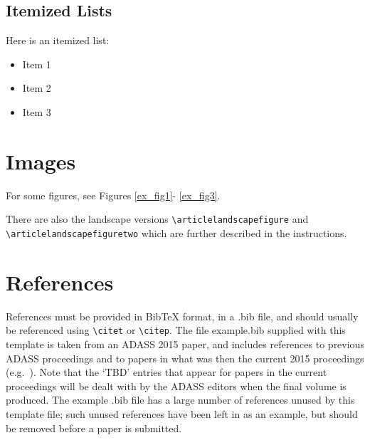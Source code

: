 \documentclass[11pt,twoside]{article}
\begin{document}
\subsection{Itemized Lists}
Here is an itemized list:
\begin{itemize}
\item Item 1
\item Item 2
\item Item 3
\end{itemize}


\section{Images}
For some figures, see Figures \ref{ex_fig1}- \ref{ex_fig3}.




\clearpage %

There are also the landscape versions \verb"\articlelandscapefigure" and \\
\verb"\articlelandscapefiguretwo" which are further described in the instructions.

\section{References}
References must be provided in BibTeX format, in a .bib file, and should usually be referenced using \verb"\citet" or \verb"\citep". The file example.bib supplied with this template is taken from an ADASS 2015 paper, and includes references to previous ADASS proceedings 
\citep[such as][]{1999ASPC..172..487P} and to papers in what was then the current 2015 proceedings (e.g.\ \citet{O11-4_adassxxv}). Note that the `TBD' entries that appear for papers in the current proceedings will be dealt with by the ADASS editors when the final volume is produced. The example .bib file has a large number of references unused by this template file; such unused references have been left in as an example, but should be removed before a paper is submitted.
\end{document}
